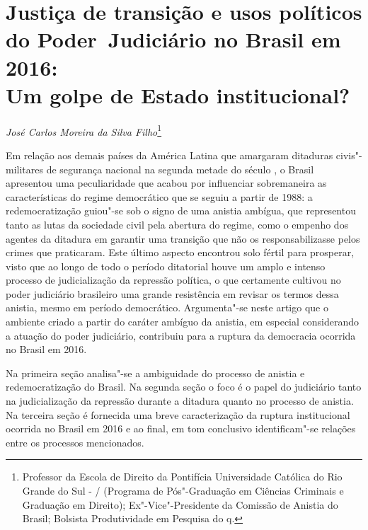 \chapter*{Justiça de transição e usos políticos do Poder~Judiciário
no Brasil em 2016:\\
Um golpe de Estado institucional?}


\begin{flushright}
\emph{José Carlos Moreira da Silva Filho}\footnote{Professor da Escola
  de Direito da Pontifícia Universidade Católica do Rio Grande do Sul -
  / (Programa de Pós"-Graduação em Ciências Criminais e Graduação em
  Direito); Ex"-Vice"-Presidente da Comissão de Anistia do Brasil;
  Bolsista Produtividade em Pesquisa do q.}
\end{flushright}

Em relação aos demais países da América Latina que amargaram ditaduras
civis"-militares de segurança nacional na segunda metade do século , o
Brasil apresentou uma peculiaridade que acabou por influenciar
sobremaneira as características do regime democrático que se seguiu a
partir de 1988: a redemocratização guiou"-se sob o signo de uma anistia
ambígua, que representou tanto as lutas da sociedade civil pela abertura
do regime, como o empenho dos agentes da ditadura em garantir uma
transição que não os responsabilizasse pelos crimes que praticaram. Este
último aspecto encontrou solo fértil para prosperar, visto que ao longo
de todo o período ditatorial houve um amplo e intenso processo de
judicialização da repressão política, o que certamente cultivou no poder
judiciário brasileiro uma grande resistência em revisar os termos dessa
anistia, mesmo em período democrático. Argumenta"-se neste artigo que o
ambiente criado a partir do caráter ambíguo da anistia, em especial
considerando a atuação do poder judiciário, contribuiu para a ruptura da
democracia ocorrida no Brasil em 2016.

Na primeira seção analisa"-se a ambiguidade do processo de anistia e
redemocratização do Brasil. Na segunda seção o foco é o papel do
judiciário tanto na judicialização da repressão durante a ditadura
quanto no processo de anistia. Na terceira seção é fornecida uma breve
caracterização da ruptura institucional ocorrida no Brasil em 2016 e ao
final, em tom conclusivo identificam"-se relações entre os processos
mencionados.

